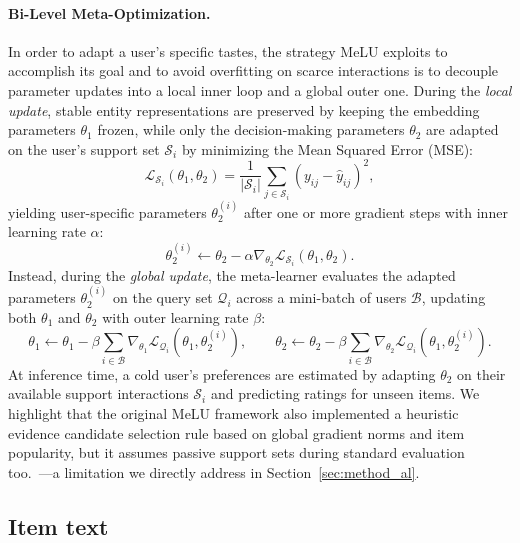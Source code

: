 \documentclass[10pt,twocolumn,letterpaper]{article}
\begin{document}
\paragraph{Bi-Level Meta-Optimization.}
In order to adapt a user’s specific tastes, the strategy MeLU exploits to accomplish its goal and to avoid overfitting on scarce interactions is to decouple parameter updates into a local inner loop and a global outer one. During the \emph{local update}, stable entity representations are preserved by keeping the embedding parameters $\theta_1$ frozen, while only the decision-making parameters $\theta_2$ are adapted on the user's support set $\mathcal{S}_i$ by minimizing the Mean Squared Error (MSE):
\begin{equation}
    \mathcal{L}_{\mathcal{S}_i}(\theta_1, \theta_2) = \frac{1}{|\mathcal{S}_i|} \sum_{j \in \mathcal{S}_i} (y_{ij} - \hat{y}_{ij})^2,
\end{equation}
yielding user-specific parameters $\theta_2^{(i)}$ after one or more gradient steps with inner learning rate $\alpha$:
\begin{equation}
    \theta_2^{(i)} \leftarrow \theta_2 - \alpha \nabla_{\theta_2} \mathcal{L}_{\mathcal{S}_i}(\theta_1, \theta_2).
\end{equation}
Instead, during the \emph{global update}, the meta-learner evaluates the adapted parameters $\theta_2^{(i)}$ on the query set $\mathcal{Q}_i$ across a mini-batch of users $\mathcal{B}$, updating both $\theta_1$ and $\theta_2$ with outer learning rate $\beta$:
\begin{equation}
    \theta_1 \leftarrow \theta_1 - \beta \sum_{i \in \mathcal{B}} \nabla_{\theta_1} \mathcal{L}_{\mathcal{Q}_i}(\theta_1, \theta_2^{(i)}), \qquad
    \theta_2 \leftarrow \theta_2 - \beta \sum_{i \in \mathcal{B}} \nabla_{\theta_2} \mathcal{L}_{\mathcal{Q}_i}(\theta_1, \theta_2^{(i)}).
\end{equation}
At inference time, a cold user's preferences are estimated by adapting $\theta_2$ on their available support interactions $\mathcal{S}_i$ and predicting ratings for unseen items. We highlight that the original MeLU framework also implemented a heuristic evidence candidate selection rule based on global gradient norms and item popularity, but it assumes passive support sets during standard evaluation too.~\cite{lee2019melu}—a limitation we directly address in Section~\ref{sec:method_al}.

\subsection{Item text}
\label{sec:method_text}
\end{document}
